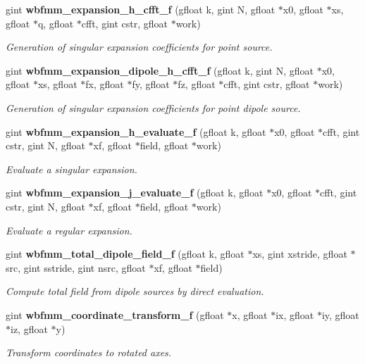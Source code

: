 \begin{DoxyCompactItemize}
gint {\bf wbfmm\+\_\+expansion\+\_\+h\+\_\+cfft\+\_\+f} (gfloat k, gint N, gfloat $\ast$x0, gfloat $\ast$xs, gfloat $\ast$q, gfloat $\ast$cfft, gint cstr, gfloat $\ast$work)
\begin{DoxyCompactList}\small\item\em Generation of singular expansion coefficients for point source. \end{DoxyCompactList}\item 
gint {\bf wbfmm\+\_\+expansion\+\_\+dipole\+\_\+h\+\_\+cfft\+\_\+f} (gfloat k, gint N, gfloat $\ast$x0, gfloat $\ast$xs, gfloat $\ast$fx, gfloat $\ast$fy, gfloat $\ast$fz, gfloat $\ast$cfft, gint cstr, gfloat $\ast$work)
\begin{DoxyCompactList}\small\item\em Generation of singular expansion coefficients for point dipole source. \end{DoxyCompactList}\item 
gint {\bf wbfmm\+\_\+expansion\+\_\+h\+\_\+evaluate\+\_\+f} (gfloat k, gfloat $\ast$x0, gfloat $\ast$cfft, gint cstr, gint N, gfloat $\ast$xf, gfloat $\ast$field, gfloat $\ast$work)
\begin{DoxyCompactList}\small\item\em Evaluate a singular expansion. \end{DoxyCompactList}\item 
gint {\bf wbfmm\+\_\+expansion\+\_\+j\+\_\+evaluate\+\_\+f} (gfloat k, gfloat $\ast$x0, gfloat $\ast$cfft, gint cstr, gint N, gfloat $\ast$xf, gfloat $\ast$field, gfloat $\ast$work)
\begin{DoxyCompactList}\small\item\em Evaluate a regular expansion. \end{DoxyCompactList}\item 
gint {\bf wbfmm\+\_\+total\+\_\+dipole\+\_\+field\+\_\+f} (gfloat k, gfloat $\ast$xs, gint xstride, gfloat $\ast$src, gint sstride, gint nsrc, gfloat $\ast$xf, gfloat $\ast$field)
\begin{DoxyCompactList}\small\item\em Compute total field from dipole sources by direct evaluation. \end{DoxyCompactList}\item 
gint {\bf wbfmm\+\_\+coordinate\+\_\+transform\+\_\+f} (gfloat $\ast$x, gfloat $\ast$ix, gfloat $\ast$iy, gfloat $\ast$iz, gfloat $\ast$y)
\begin{DoxyCompactList}\small\item\em Transform coordinates to rotated axes. \end{DoxyCompactList}\item 

\end{DoxyCompactItemize}
